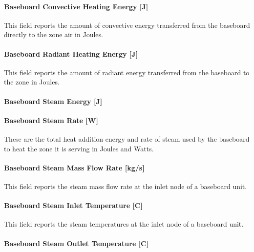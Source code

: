 \paragraph{Baseboard Convective Heating Energy {[}J{]}}\label{baseboard-convective-heating-energy-j-1}

This field reports the amount of convective energy transferred from the baseboard directly to the zone air in Joules.

\paragraph{Baseboard Radiant Heating Energy {[}J{]}}\label{baseboard-radiant-heating-energy-j-1}

This field reports the amount of radiant energy transferred from the baseboard to the zone in Joules.

\paragraph{Baseboard Steam Energy {[}J{]}}\label{baseboard-steam-energy-j}

\paragraph{Baseboard Steam Rate {[}W{]}}\label{baseboard-steam-rate-w}

These are the total heat addition energy and rate of steam used by the baseboard to heat the zone it is serving in Joules and Watts.

\paragraph{Baseboard Steam Mass Flow Rate {[}kg/s{]}}\label{baseboard-steam-mass-flow-rate-kgs}

This field reports the steam mass flow rate at the inlet node of a baseboard unit.

\paragraph{Baseboard Steam Inlet Temperature {[}C{]}}\label{baseboard-steam-inlet-temperature-c}

This field reports the steam temperatures at the inlet node of a baseboard unit.

\paragraph{Baseboard Steam Outlet Temperature {[}C{]}}\label{baseboard-steam-outlet-temperature-c}

